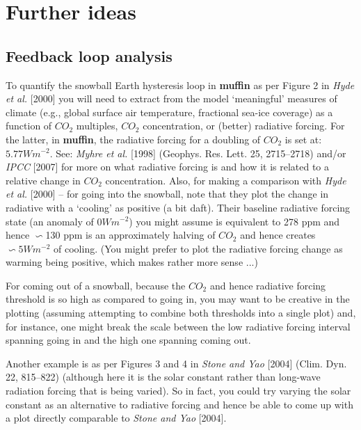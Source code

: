 \documentclass[11pt,fleqn]{book} %
\begin{document}

\newpage


\section{Further ideas}


\subsection{Feedback loop analysis}

To quantify the snowball Earth hysteresis loop in \textbf{muffin} as per Figure 2 in \textit{Hyde et al.} [2000] you will need to extract from the model ‘meaningful’ measures of climate (e.g., global surface air temperature, fractional sea-ice coverage) as a function of \(CO_{2}\) multiples, \(CO_{2}\) concentration, or (better) radiative forcing. For the latter, in \textbf{muffin}, the radiative forcing for a doubling of \(CO_{2}\) is set at: \(5.77 Wm^{-2}\). See: \textit{Myhre et al.} [1998] (Geophys. Res. Lett. 25, 2715–2718) and/or \textit{IPCC} [2007] for more on what radiative forcing is and how it is related to a relative change in \(CO_{2}\) concentration. Also, for making a comparison with \textit{Hyde et al.} [2000] -- for going into the snowball, note that they plot the change in radiative with a ‘cooling’ as positive (a bit daft). Their baseline radiative forcing state (an anomaly of \(0 Wm^{-2}\)) you might assume is equivalent to 278 ppm and hence \(\backsim\)130 ppm is an approximately halving of \(CO_{2}\) and hence creates \(\backsim5 Wm^{-2}\) of cooling. (You might prefer to plot the radiative forcing change as warming being positive, which makes rather more sense ...)

For coming out of a snowball, because the \(CO_{2}\) and hence radiative forcing threshold is so high as compared to going in, you may want to be creative in the plotting (assuming attempting to combine both thresholds into a single plot) and, for instance, one might break the scale between the low radiative forcing interval spanning going in and the high one spanning coming out.

Another example is as per Figures 3 and 4 in \textit{Stone and Yao} [2004] (Clim. Dyn. 22, 815–822) (although here it is the solar constant rather than long-wave radiation forcing that is being varied). So in fact, you could try varying the solar constant as an alternative to radiative forcing and hence be able to come up with a plot directly comparable to \textit{Stone and Yao} [2004].
\end{document}
